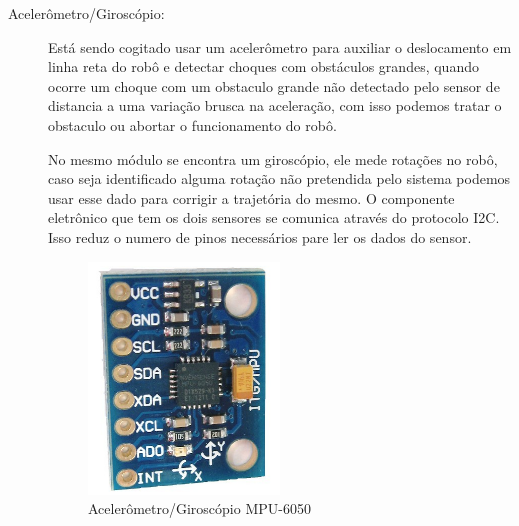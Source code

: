 \begin{description}
\item[Acelerômetro/Giroscópio:] Está sendo cogitado usar um acelerômetro
para auxiliar o deslocamento em linha reta do robô e detectar choques com
obstáculos grandes, quando ocorre um choque com um obstaculo grande não
detectado pelo sensor de distancia a uma variação brusca na aceleração, com
isso podemos tratar o obstaculo ou abortar o funcionamento do robô.
\par
No mesmo módulo se encontra um giroscópio, ele mede rotações no robô, caso
seja identificado alguma rotação não pretendida pelo sistema podemos usar esse
dado para corrigir a trajetória do mesmo. O componente eletrônico que tem os
dois sensores se comunica através do protocolo I2C. Isso reduz o numero de
pinos necessários pare ler os dados do sensor.
\par
\begin{figure}[h]
  \centering
  \includegraphics[width=0.5\textwidth]{figures/accelerometer.png}
  \caption{Acelerômetro/Giroscópio MPU-6050 \cite{arduino2016}}
  \label{fig:accelerometer}
\end{figure}
\FloatBarrier


\end{description}
